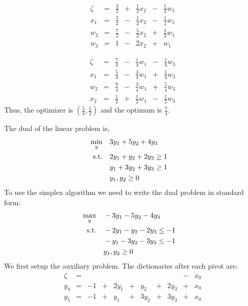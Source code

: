 \documentclass[letterpaper,12pt]{article}
\theoremstyle{definition}
\begin{document}
\begin{equation*}
\begin{matrix}
\zeta &= &\frac{3}{2}&+& \frac{1}{2} x_2 &-& \frac{1}{2} w_1 \\
\hline
x_1 &= &\frac{3}{2} &-& \frac{1}{2} x_2 &-&\frac{1}{2} w_1\\
w_2 &= &\frac{7}{2}&-& \frac{5}{2} x_2 &+& \frac{1}{2} w_1 \\
w_3 &= &1 &- & 2x_2 &+& w_1
\end{matrix}
\end{equation*}

\begin{equation*}
\begin{matrix}
\zeta &= &\frac{7}{4}&-& \frac{1}{4} w_1 &-& \frac{1}{4} w_3 \\
\hline
x_1 &= &\frac{5}{4} &-& \frac{3}{4} w_1 &+&\frac{1}{4} w_3\\
w_2 &= &\frac{9}{4}&-& \frac{3}{4} w_1 &+& \frac{5}{4} w_3 \\
x_2 &= &\frac{1}{2} &+& \frac{1}{2} w_1 &-& \frac{1}{2} w_3
\end{matrix}
\end{equation*}
Thus, the optimizer is $(\frac{5}{4}, \frac{1}{2})$ and the optimum is $\frac{7}{4}$.

The dual of the linear problem is,
\begin{align*}
  \min_y\quad        &3y_1 + 5y_2 + 4y_3                    \\
  \text{s.t.\quad} & 2y_1 + y_2 + 2y_3 \geq 1 &    \\
                   & y_1 + 3y_2 + 3y_3 \geq 1      \\
                   & y_1, y_2 \geq 0          \\
\end{align*}
To use the simplex algorithm we need to write the dual problem in standard form: 
\begin{align*}
  \max_y\quad        &-3y_1 - 5y_2 - 4y_3                    \\
  \text{s.t.\quad} & -2y_1 - y_2 - 2y_3 \leq -1 &    \\
                   & -y_1 - 3y_2 - 3y_3 \leq -1      \\
                   & y_1, y_2 \geq 0          \\
\end{align*}
We first setup the auxiliary problem. The dictionaries after each pivot are:
\begin{equation*}
\begin{matrix}
\zeta &= & & & & & & & &-& x_0 \\
\hline
y_4 &=&-1 &+& 2y_1 &+& y_2 &+& 2y_3 &+& x_0  \\
y_5 &=&-1 &+& y_1 &+&3y_2 &+&3y_3&+& x_0
\end{matrix}
\end{equation*}
\end{document}
